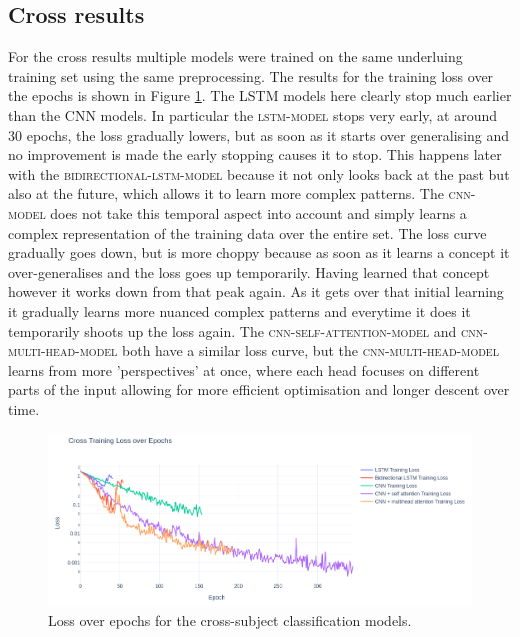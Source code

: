 \documentclass[conference]{IEEEtran}
\begin{document}
\subsection{Cross results}
For the cross results multiple models were trained on the same underluing training set using the same preprocessing. The results for the training loss over the epochs is shown in Figure \ref{fig:cross_loss_over_epoch}. The LSTM models here clearly stop much earlier than the CNN models. In particular the \textsc{lstm-model} stops very early, at around $30$ epochs, the loss gradually lowers, but as soon as it starts over generalising and no improvement is made the early stopping causes it to stop. This happens later with the \textsc{bidirectional-lstm-model} because it not only looks back at the past but also at the future, which allows it to learn more complex patterns. The \textsc{cnn-model} does not take this temporal aspect into account and simply learns a complex representation of the training data over the entire set. The loss curve gradually goes down, but is more choppy because as soon as it learns a concept it over-generalises and the loss goes up temporarily. Having learned that concept however it works down from that peak again. As it gets over that initial learning it gradually learns more nuanced complex patterns and everytime it does it temporarily shoots up the loss again. The \textsc{cnn-self-attention-model} and \textsc{cnn-multi-head-model} both have a similar loss curve, but the \textsc{cnn-multi-head-model} learns from more 'perspectives' at once, where each head focuses on different parts of the input allowing for more efficient optimisation and longer descent over time.

\begin{figure}[t]
    \centering
    \includegraphics[width=\textwidth]{figures/cross_loss_over_epoch_small.png}
    \caption{Loss over epochs for the cross-subject classification models.}
    \label{fig:cross_loss_over_epoch}
\end{figure}
\end{document}
